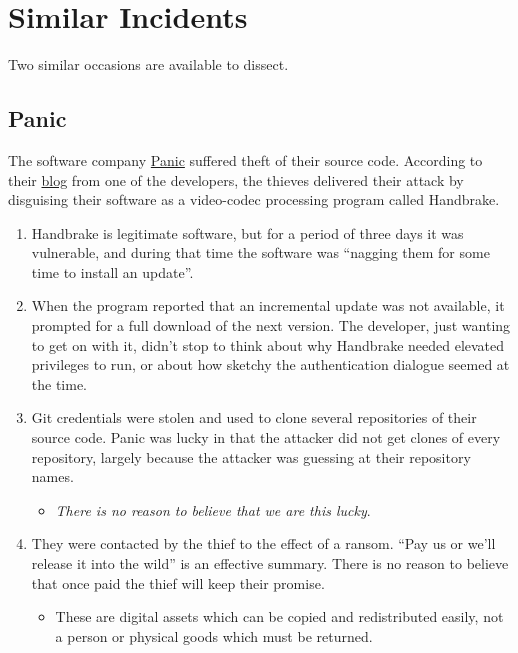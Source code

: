 \hypertarget{similar-incidents}{%
\section{Similar Incidents}\label{similar-incidents}}

Two similar occasions are available to dissect.

\hypertarget{panic}{%
\subsection{Panic}\label{panic}}

The software company \href{https://panic.com}{Panic} suffered theft of
their source code. According to their
\href{https://panic.com/blog/stolen-source-code/}{blog} from one of the
developers, the thieves delivered their attack by disguising their
software as a video-codec processing program called Handbrake.

\begin{enumerate}
\def\labelenumi{\arabic{enumi}.}
\item
  Handbrake is legitimate software, but for a period of three days it
  was vulnerable, and during that time the software was ``nagging them
  for some time to install an update''.
\item
  When the program reported that an incremental update was not
  available, it prompted for a full download of the next version. The
  developer, just wanting to get on with it, didn't stop to think about
  why Handbrake needed elevated privileges to run, or about how sketchy
  the authentication dialogue seemed at the time.
\item
  Git credentials were stolen and used to clone several repositories of
  their source code. Panic was lucky in that the attacker did not get
  clones of every repository, largely because the attacker was guessing
  at their repository names.

  \begin{itemize}
  \tightlist
  \item
    \emph{There is no reason to believe that we are this lucky}.
  \end{itemize}
\item
  They were contacted by the thief to the effect of a ransom. ``Pay us
  or we'll release it into the wild'' is an effective summary. There is
  no reason to believe that once paid the thief will keep their promise.

  \begin{itemize}
  \tightlist
  \item
    These are digital assets which can be copied and redistributed
    easily, not a person or physical goods which must be returned.
  \end{itemize}
\end{enumerate}

